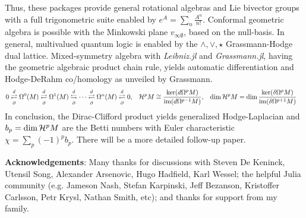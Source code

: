 \documentclass[]{article}
\theoremstyle{definition}
\theoremstyle{remark}
\begin{document}
Thus, these packages provide general rotational algebras and Lie bivector groups with a full trigonometric suite enabled by $ e^{A} = \sum_n \frac{A^n}{n!} $.
Conformal geometric algebra is possible with the Minkowski plane $v_{\infty\emptyset}$, based on the null-basis.
In general, multivalued quantum logic is enabled by the $\wedge,\vee,\star$ Grassmann-Hodge dual lattice.
Mixed-symmetry algebra with \textit{Leibniz.jl} and \textit{Grassmann.jl}, having the geometric algebraic product chain rule, yields automatic differentiation and Hodge-DeRahm co/homology  as unveiled by Grassmann.
\begin{align*}
	0 &\overset{d}{\underset{\partial}{\rightleftarrows}} \Omega^0(M) \overset{d}{\underset{\partial}{\rightleftarrows}} \Omega^1(M) \overset{d}{\underset{\partial}{\leftrightarrows}} \cdots \overset{d}{\underset{\partial}{\rightleftarrows}} \Omega^n(M) \overset{d}{\underset{\partial}{\rightleftarrows}} 0, & \mathcal{H}^pM &\cong \frac{\ker(d\Omega^pM)}{\text{im}(d\Omega^{p-1}M)}, & \dim\mathcal{H}^pM &= \dim\frac{\ker(\delta\Omega^pM)}{\text{im}(\delta\Omega^{p+1}M)}
\end{align*}
In conclusion, the Dirac-Clifford product yields generalized Hodge-Laplacian and $b_p=\dim\mathcal{H}^pM$ are the Betti numbers with Euler characteristic $\chi = \sum_p (-1)^pb_p$.
There will be a more detailed follow-up paper.

\textbf{Acknowledgements}: Many thanks for discussions with Steven De Keninck, Utensil Song, Alexander Arsenovic, Hugo Hadfield, Karl Wessel; the helpful Julia community (e.g. Jameson Nash, Stefan Karpinski, Jeff Bezanson, Kristoffer Carlsson, Petr Krysl, Nathan Smith, etc); and thanks for support from my family.



\end{document}
